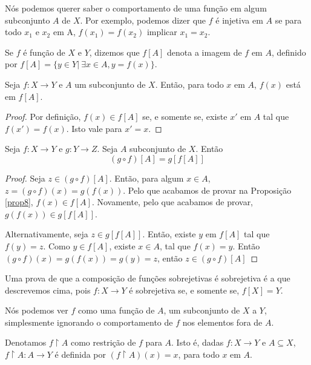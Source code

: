Nós podemos querer saber o comportamento de uma função em algum subconjunto
$A$ de  $X$. Por exemplo, podemos dizer que $f$ é injetiva em $A$ se para
todo $x_1$ e $x_2$ em A, $f(x_1) = f(x_2) $ implicar $x_1 = x_2 $.

\begin{definition}
    \label{def8}
    Se $f$ é função de $X$ e $Y$, dizemos que $f[A]$ denota a imagem de $f$ em
    $A$, definido por $f[A] = \{y \in Y | ~\exists x \in A, y = f(x)\}$.
\end{definition}

\begin{theorem}
    \label{prop7}
    Seja $f: X \to Y $ e $A$ um subconjunto de $X$. Então, para todo $x$ em
    $A$, $f(x)$ está em $f[A]$.
\end{theorem}

\begin{proof}
    Por definição, $f(x) \in f[A] $ se, e somente se, existe $x'$ em $A$ tal que
    $f(x') = f(x)$. Isto vale para  $x' = x $.
\end{proof}

\begin{theorem}
    \label{prop8}
    Seja $f: X \to Y$ e $g: Y \to Z$. Seja $A$ subconjunto de $X$. Então
    $$(g \circ f)[A] = g[f[A]]$$
\end{theorem}

\begin{proof}
    Seja $z \in (g \circ f)[A]$. Então, para algum $x \in A$, $z = (g \circ f)(x) = g(f(x))$.
    Pelo que acabamos de provar na Proposição \ref{prop8}, $f(x) \in f[A]$. Novamente, pelo
    que acabamos de provar, $g(f(x)) \in g[f[A]] $.

    Alternativamente, seja $z \in g[f[A]]$. Então, existe $y$ em $f[A]$ tal que
    $f(y) = z$. Como $y \in f[A]$, existe $x \in A$, tal que $f(x) = y$. Então
    $(g \circ f)(x) = g(f(x)) = g(y) = z$, então $z \in (g \circ f)[A] $
\end{proof}

Uma prova de que a composição de funções sobrejetivas é
sobrejetiva é a que descrevemos cima, pois $f: X \to Y$ é
sobrejetiva se, e somente se, $f[X] = Y$.

Nós podemos ver $f$ como uma função de $A$, um subconjunto de $X$ a $Y$, simplesmente
ignorando o comportamento de $f$ nos elementos fora de $A$.

\begin{definition}
    \label{def9}
    Denotamos $f \upharpoonright A$ como restrição de $f$ para $A$. Isto é, dadas $f: X \to Y$
    e $A \subseteq X$, $f \upharpoonright A : A \to Y$ é definida por $(f \upharpoonright A)(x) = x$,
    para todo $x$ em $A$.
\end{definition}

